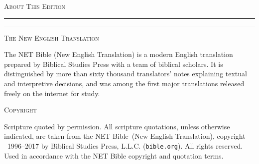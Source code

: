 \clearpage
\thispagestyle{empty}%
\null\vspace*{16mm}
\begin{center}
  {\Large\booktitlefont\scshape About This Edition\par}
  \vspace{3pt}
  {\color{wisdom!70}\rule{28mm}{0.4pt}\enspace\rule{28mm}{0.4pt}\par}
\end{center}
\vspace{9mm}
\begin{center}\begin{minipage}{0.74\textwidth}
\setlength{\parskip}{6pt plus 2pt}\small

{\booktitlefont\scshape The New English Translation}\par
The NET Bible (New English Translation) is a modern English translation prepared
by Biblical Studies Press with a team of biblical scholars. It is distinguished
by more than sixty thousand translators' notes explaining textual and
interpretive decisions, and was among the first major translations released
freely on the internet for study.

\medskip
{\booktitlefont\scshape Copyright}\par
Scripture quoted by permission. All scripture quotations, unless otherwise
indicated, are taken from the NET Bible\textregistered\ (New English
Translation), copyright \textcopyright~1996--2017 by Biblical Studies Press,
L.L.C. (\texttt{bible.org}). All rights reserved. Used in accordance with the NET
Bible copyright and quotation terms.


\end{minipage}\end{center}
\vfill
\clearpage
